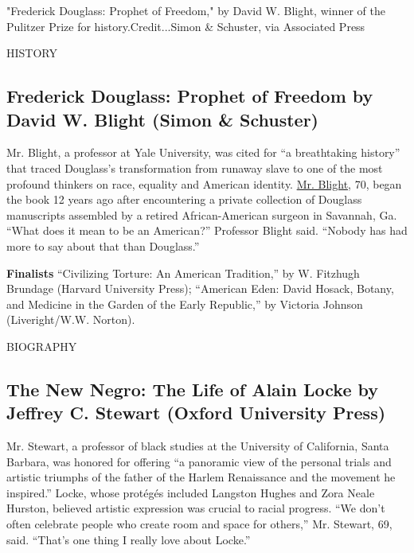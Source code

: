 "Frederick Douglass: Prophet of Freedom," by David W. Blight, winner of
the Pulitzer Prize for history.Credit...Simon \& Schuster, via
Associated Press

HISTORY

\hypertarget{frederick-douglass-prophet-of-freedom-by-david-w-blight-simon--schuster}{%
\subsection{Frederick Douglass: Prophet of Freedom by David W. Blight
(Simon \&
Schuster)}\label{frederick-douglass-prophet-of-freedom-by-david-w-blight-simon--schuster}}

Mr. Blight, a professor at Yale University, was cited for ``a
breathtaking history'' that traced Douglass's transformation from
runaway slave to one of the most profound thinkers on race, equality and
American identity. \href{http://www.davidwblight.com/}{Mr. Blight}, 70,
began the book 12 years ago after encountering a private collection of
Douglass manuscripts assembled by a retired African-American surgeon in
Savannah, Ga. ``What does it mean to be an American?'' Professor Blight
said. ``Nobody has had more to say about that than Douglass.''

\textbf{Finalists} ``Civilizing Torture: An American Tradition,'' by W.
Fitzhugh Brundage (Harvard University Press); ``American Eden: David
Hosack, Botany, and Medicine in the Garden of the Early Republic,'' by
Victoria Johnson (Liveright/W.W. Norton).

BIOGRAPHY

\hypertarget{the-new-negro-the-life-of-alain-locke-by-jeffrey-c-stewart-oxford-university-press}{%
\subsection{The New Negro: The Life of Alain Locke by Jeffrey C. Stewart
(Oxford University
Press)}\label{the-new-negro-the-life-of-alain-locke-by-jeffrey-c-stewart-oxford-university-press}}

Mr. Stewart, a professor of black studies at the University of
California, Santa Barbara, was honored for offering ``a panoramic view
of the personal trials and artistic triumphs of the father of the Harlem
Renaissance and the movement he inspired.'' Locke, whose protégés
included Langston Hughes and Zora Neale Hurston, believed artistic
expression was crucial to racial progress. ``We don't often celebrate
people who create room and space for others,'' Mr. Stewart, 69, said.
``That's one thing I really love about Locke.''

